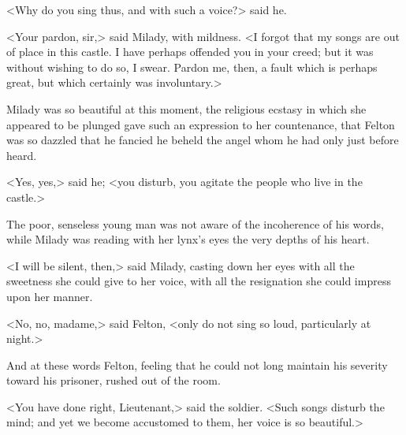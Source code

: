 <Why do you sing thus, and with such a voice?> said he. 

<Your pardon, sir,> said Milady, with mildness. <I forgot that my songs are out of place in this castle. I have perhaps offended you in your creed; but it was without wishing to do so, I swear. Pardon me, then, a fault which is perhaps great, but which certainly was involuntary.> 

Milady was so beautiful at this moment, the religious ecstasy in which she appeared to be plunged gave such an expression to her countenance, that Felton was so dazzled that he fancied he beheld the angel whom he had only just before heard. 

<Yes, yes,> said he; <you disturb, you agitate the people who live in the castle.> 

The poor, senseless young man was not aware of the incoherence of his words, while Milady was reading with her lynx's eyes the very depths of his heart. 

<I will be silent, then,> said Milady, casting down her eyes with all the sweetness she could give to her voice, with all the resignation she could impress upon her manner. 

<No, no, madame,> said Felton, <only do not sing so loud, particularly at night.> 

And at these words Felton, feeling that he could not long maintain his severity toward his prisoner, rushed out of the room. 

<You have done right, Lieutenant,> said the soldier. <Such songs disturb the mind; and yet we become accustomed to them, her voice is so beautiful.>